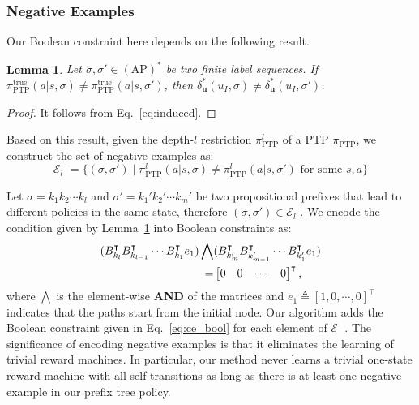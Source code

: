 \documentclass[letterpaper, 10 pt, conference]{ieeeconf}
\newcommand{\ptp}{\pi_{\mathrm{PTP}}}
\newtheorem{lemma}{\textbf{Lemma}}
\begin{document}
\subsubsection{Negative Examples}\label{sec:opt}
Our Boolean constraint here depends on the following result.
\begin{lemma} \label{lem:neg}
    Let $\sigma, \sigma' \in (\mathrm{AP})^*$ be two finite label sequences. If $\ptp^{\mathrm{true}}(a|s, \sigma) \neq \ptp^{\mathrm{true}}(a|s, \sigma')$, then  $\delta_\textbf{u}^*(u_I,\sigma) \neq \delta_\textbf{u}^*(u_I,\sigma')$. 
\end{lemma}
\begin{proof}
    It follows from Eq.~\eqref{eq:induced}.
\end{proof}

Based on this result, given the depth-$l$ restriction $\pi_{\mathrm{PTP}}^l$ of a PTP $\ptp$, we construct the set of negative examples as:
$$\mathcal{E}^-_l = \{(\sigma, \sigma') \mid \pi_{\mathrm{PTP}}^l(a|s, \sigma) \neq \pi_{\mathrm{PTP}}^l(a|s, \sigma') \text{ for some } s,a \}$$

Let $ \sigma = k_1 k_2 \cdots k_l$ and $\sigma' = k_1'k_2' \cdots k_m'$ be two propositional prefixes that lead to different policies in the same state, therefore $(\sigma,\sigma')\in \mathcal{E}^-_l$. We encode the condition given by Lemma~\ref{lem:neg} into Boolean constraints as:
\begin{align}\label{eq:ce_bool}
    (B_{k_l}^\intercal B_{k_{l-1}}^\intercal \cdots B_{k_1}^\intercal e_1)\bigwedge &(B_{k_m'}^\intercal B_{k_{m-1}'}^\intercal \cdots B_{k_1'}^\intercal e_1) \notag \\ = &\begin{bmatrix}0 &0 & \cdots & 0\end{bmatrix}^\intercal,
\end{align}
where $\bigwedge$ is the element-wise \textbf{AND} of the matrices and $e_1 \triangleq [1,0,\cdots,0]^\intercal$ indicates that the paths start from the initial node. Our algorithm adds the Boolean constraint given in Eq.~\eqref{eq:ce_bool} for each element of $\mathcal{E}^- $. The significance of encoding negative examples is that it eliminates the learning of trivial reward machines. In particular, our method never learns a trivial one-state reward machine with all self-transitions \cite{icarte2023learning} as long as there is at least one negative example in our prefix tree policy. 
\end{document}
